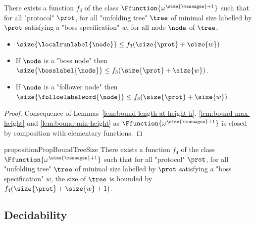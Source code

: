 \begin{corollary}
	\label{cor:bound-node-size}
	There exists a function $f_3$ of the class $\Ffunction{\omega^{\size{\messages}+1}}$ such that for all "protocol" $\prot$, for all "unfolding tree" $\tree$ of minimal size labelled by $\prot$ satisfying a "boss specification" $w$, for all node $\node$ of $\tree$,
	
		\begin{itemize}
		\item $\size{\localrunlabel{\node}} \leq f_3(\size{\prot}+ \size{w})$
			
		\item If $\node$ is a "boss node" then $\size{\bosslabel{\node}} \leq f_3(\size{\prot}+ \size{w})$.
		
		\item If $\node$ is a "follower node" then $\size{\followlabelword{\node}} \leq f_3(\size{\prot}+ \size{w})$.
	\end{itemize} 
\end{corollary}

\ifproofs
\begin{proof}
	Consequence of Lemmas~\ref{lem:bound-length-at-height-h}, \ref{lem:bound-max-height} and \ref{lem:bound-min-height} as $\Ffunction{\omega^{\size{\messages}+1}}$ is closed by composition with elementary functions.
\end{proof}
\fi
\begin{restatable}{proposition}{PropBoundTreeSize}
	\label{prop:bound-tree-size}
	There exists a function $f_4$ of the class $\Ffunction{\omega^{\size{\messages}+1}}$ such that for all "protocol" $\prot$, for all "unfolding tree" $\tree$ of minimal size labelled by $\prot$ satisfying a "boss specification" $w$, the size of $\tree$ is bounded by $f_4(\size{\prot} + \size{w}+1)$.
\end{restatable}




\subsection{Decidability}
\label{sec:decidability-end}


